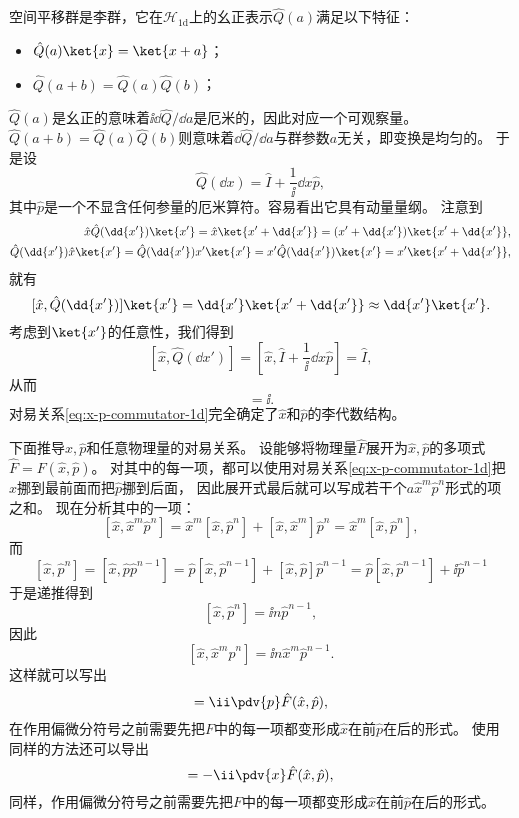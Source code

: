 空间平移群是李群，它在$\mathcal{H}_{1\text{d}}$上的幺正表示$\hat{Q}(a)$满足以下特征：
\begin{itemize}
    \item $\hat{Q}(a) \ket{x} = \ket{x+a}$；
    \item $\hat{Q}(a+b) = \hat{Q}(a) \hat{Q}(b)$；
\end{itemize}
$\hat{Q}(a)$是幺正的意味着$\ii \dd{\hat{Q}} / \dd{a}$是厄米的，因此对应一个可观察量。
$\hat{Q}(a+b)=\hat{Q}(a) \hat{Q}(b)$则意味着$\dd{\hat{Q}} / \dd{a}$与群参数$a$无关，即变换是均匀的。
于是设
\begin{equation}
    \hat{Q}(\dd{x}) = \hat{I} + \frac{1}{\ii} \dd{x} \hat{p},
\end{equation}
其中$\hat{p}$是一个不显含任何参量的厄米算符。容易看出它具有动量量纲。
注意到
\[
    \begin{split}
        \hat{x} \hat{Q}(\dd{x'}) \ket{x'} = \hat{x} \ket{x' + \dd{x'}} = (x' + \dd{x'}) \ket{x' + \dd{x'}}, \\
        \hat{Q}(\dd{x'}) \hat{x} \ket{x'} = \hat{Q}(\dd{x'}) x' \ket{x'} = x' \hat{Q}(\dd{x'}) \ket{x'} = x' \ket{x' + \dd{x'}},
    \end{split}
\]
就有
\[
    [\hat{x}, \hat{Q}(\dd{x'})] \ket{x'} = \dd{x'} \ket{x' + \dd{x'}} \approx \dd{x'} \ket{x'}.
\]
考虑到$\ket{x'}$的任意性，我们得到
\[
    [\hat{x}, \hat{Q}(\dd{x'})] = \left[\hat{x}, \hat{I} + \frac{1}{\ii} \dd{x} \hat{p}\right] = \hat{I},
\]
从而
\begin{equation}
    [\hat{x}, \hat{p}] = \ii . 
    \label{eq:x-p-commutator-1d}   
\end{equation}
对易关系\eqref{eq:x-p-commutator-1d}完全确定了$\hat{x}$和$\hat{p}$的李代数结构。

下面推导$\hat{x}, \hat{p}$和任意物理量的对易关系。
设能够将物理量$\hat{F}$展开为$\hat{x}, \hat{p}$的多项式$\hat{F} = F(\hat{x}, \hat{p})$。
对其中的每一项，都可以使用对易关系\eqref{eq:x-p-commutator-1d}把$\hat{x}$挪到最前面而把$\hat{p}$挪到后面，
因此展开式最后就可以写成若干个$a \hat{x}^m \hat{p}^n$形式的项之和。
现在分析其中的一项：
\[
    [\hat{x}, \hat{x}^m \hat{p}^n] = \hat{x}^m [\hat{x}, \hat{p}^n] + [\hat{x}, \hat{x}^m] \hat{p}^n = \hat{x}^m [\hat{x}, \hat{p}^n],
\]
而
\[
    [\hat{x}, \hat{p}^n] = [\hat{x}, \hat{p} \hat{p}^{n-1}] = 
    \hat{p} [\hat{x}, \hat{p}^{n-1}] + [\hat{x}, \hat{p}] \hat{p}^{n-1} = \hat{p} [\hat{x}, \hat{p}^{n-1}] + \ii \hat{p}^{n-1}
\]
于是递推得到
\[
    [\hat{x}, \hat{p}^n] = \ii n \hat{p}^{n-1},
\]
因此
\[
    [\hat{x}, \hat{x}^m \hat{p}^n] = \ii n \hat{x}^m \hat{p}^{n-1}.
\]
这样就可以写出
\begin{equation}
    [\hat{x}, \hat{F}(\hat{x}, \hat{p})] = \ii \pdv{p} \hat{F}(\hat{x}, \hat{p}),
\end{equation}
在作用偏微分符号之前需要先把$F$中的每一项都变形成$\hat{x}$在前$\hat{p}$在后的形式。
使用同样的方法还可以导出
\begin{equation}
    [\hat{p}, \hat{F}(\hat{x}, \hat{p})] = - \ii \pdv{x} \hat{F}(\hat{x}, \hat{p}),
\end{equation}
同样，作用偏微分符号之前需要先把$F$中的每一项都变形成$\hat{x}$在前$\hat{p}$在后的形式。

